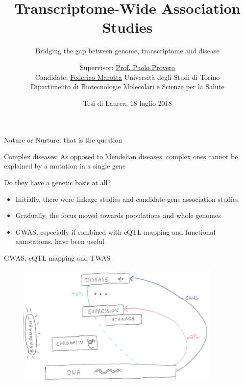 \documentclass[aspectratio=169,12pt]{beamer}
\title{Transcriptome-Wide Association Studies}
\subtitle{\normalsize Bridging the gap between genome, transcriptome and 
disease}
\author[Federico Marotta]
{
	\footnotesize
	Supervisor: \href{mailto:paolo.provero@unito.it}{Prof. Paolo 
		Provero}
	\\
	Candidate: \href{mailto:federico.marotta@edu.unito.it}{Federico 
		Marotta}
	\vfill
	\scriptsize
	Università degli Studi di Torino
	\\
	Dipartimento di Biotecnologie Molecolari e Scienze per la Salute
	\vfill
}
\institute[UniTo, DBMSS]
{



}
\date{\tiny Tesi di Laurea, 18 luglio 2018}
\begin{document}
\maketitle


\begin{frame}{Nature or Nurture: that is the question}

	\bigskip

	\begin{block}{Complex diseases:}
		As opposed to Mendelian diseases, complex ones cannot be 
explained by a mutation in a single gene
	\end{block}

	\bigskip

	Do they have a genetic basis at all?

	\pause

	\begin{itemize}
		\item Initially, there were \alert{linkage studies} and 
\alert{candidate-gene association studies}
		\item Gradually, the focus moved towards \alert{populations and 
whole genomes}
		\item \alert{GWAS}, especially if combined with eQTL mapping and 
functional annotations, have been useful
	 \end{itemize}


\end{frame}

\begin{frame}{GWAS, eQTL mapping and TWAS}

	\begin{figure}
		\includegraphics[width=0.9\textwidth]{introduction/summary}
	\end{figure}

\end{frame}
\end{document}
